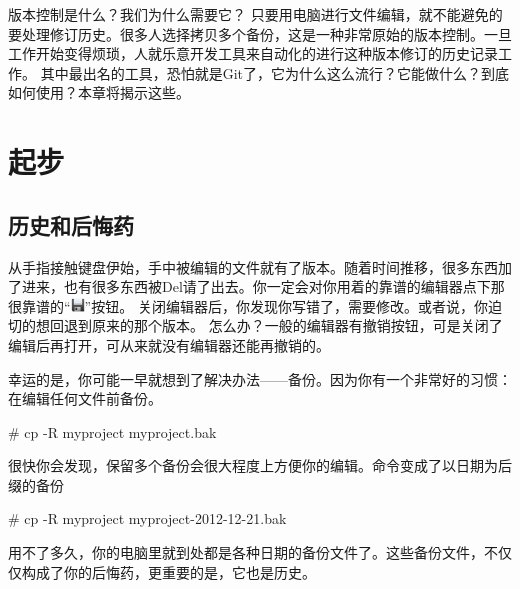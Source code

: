 
版本控制是什么？我们为什么需要它？
只要用电脑进行文件编辑，就不能避免的要处理修订历史。很多人选择拷贝多个备份，这是一种非常原始的版本控制。一旦工作开始变得烦琐，人就乐意开发工具来自动化的进行这种版本修订的历史记录工作。
其中最出名的工具，恐怕就是Git了，它为什么这么流行？它能做什么？到底如何使用？本章将揭示这些。


\section{起步}
\subsection{历史和后悔药}

从手指接触键盘伊始，手中被编辑的文件就有了版本。随着时间推移，很多东西加了进来，也有很多东西被Del请了出去。你一定会对你用着的靠谱的编辑器点下那很靠谱的“\includegraphics[width=1em]{pics/document-save.png}”按钮。 %
关闭编辑器后，你发现你写错了，需要修改。或者说，你迫切的想回退到原来的那个版本。
怎么办？一般的编辑器有撤销按钮，可是关闭了编辑后再打开，可从来就没有编辑器还能再撤销的。

幸运的是，你可能一早就想到了解决办法——备份。因为你有一个非常好的习惯：在编辑任何文件前备份。

\begin{code}
\# cp -R myproject myproject.bak
\end{code}

很快你会发现，保留多个备份会很大程度上方便你的编辑。命令变成了以日期为后缀的备份

\begin{code}
\# cp -R myproject myproject-2012-12-21.bak
\end{code}

用不了多久，你的电脑里就到处都是各种日期的备份文件了。这些备份文件，不仅仅构成了你的后悔药，更重要的是，它也是历史。

